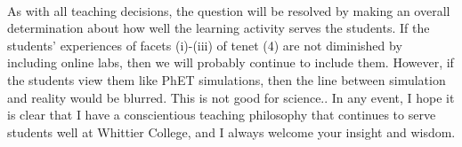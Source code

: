 \documentclass[../../../main.tex]{subfiles}
\begin{document}
\\
\vspace{0.25cm}
As with all teaching decisions, the question will be resolved by making an overall determination about how well the learning activity serves the students.  If the students' experiences of facets (i)-(iii) of tenet (4) are not diminished by including online labs, then we will probably continue to include them.  However, if the students view them like PhET simulations, then the line between simulation and reality would be blurred.  This is not good for science..  In any event, I hope it is clear that I have a conscientious teaching philosophy that continues to serve students well at Whittier College, and I always welcome your insight and wisdom.
\end{document}

